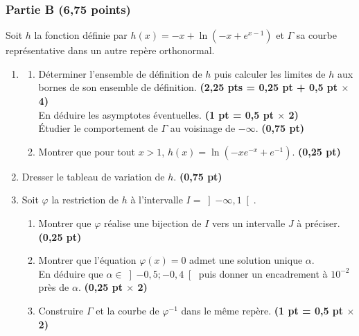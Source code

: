 \documentclass[12pt,a4paper]{article}
\begin{document}
\subsubsection*{Partie B \mdseries(6,75 points)}
Soit $h$ la fonction définie par $h(x) = -x + \ln(-x + e^{x-1})$ et $\Gamma$ sa courbe représentative dans un autre repère orthonormal.

\begin{enumerate}
  \item 
  \begin{enumerate}
    \item Déterminer l’ensemble de définition de $h$ puis calculer les limites de $h$ aux bornes de son ensemble de définition. \textbf{(2,25 pts = 0,25 pt + 0,5 pt $\times$ 4)}\\
    En déduire les asymptotes éventuelles. \textbf{(1 pt = 0,5 pt $\times$ 2)}\\
    Étudier le comportement de $\Gamma$ au voisinage de $-\infty$. \textbf{(0,75 pt)}
    \item Montrer que pour tout $x > 1$, $h(x) = \ln(-x e^{-x} + e^{-1})$. \textbf{(0,25 pt)}
  \end{enumerate}
  \item Dresser le tableau de variation de $h$. \textbf{(0,75 pt)}
  \item Soit $\varphi$ la restriction de $h$ à l’intervalle $I = \left]-\infty, 1\right[$.
  \begin{enumerate}
    \item Montrer que $\varphi$ réalise une bijection de $I$ vers un intervalle $J$ à préciser. \textbf{(0,25 pt)}
    \item Montrer que l’équation $\varphi(x) = 0$ admet une solution unique $\alpha$.\\
    En déduire que $\alpha \in \left]-0{,}5 ; -0{,}4\right[$ puis donner un encadrement à $10^{-2}$ près de $\alpha$. \textbf{(0,25 pt $\times$ 2)}
    \item Construire $\Gamma$ et la courbe de $\varphi^{-1}$ dans le même repère. \textbf{(1 pt = 0,5 pt $\times$ 2)}
  \end{enumerate}
\end{enumerate}
\end{document}
